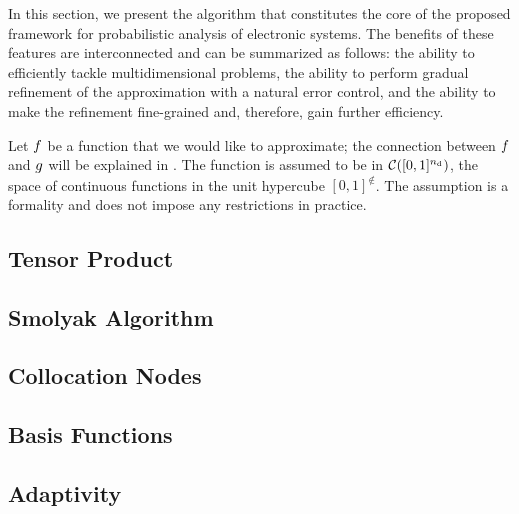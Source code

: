 In this section, we present the algorithm that constitutes the core of the
proposed framework for probabilistic analysis of electronic systems.  The benefits of these features are interconnected and can be
summarized as follows: the ability to efficiently tackle multidimensional
problems, the ability to perform gradual refinement of the approximation with a
natural error control, and the ability to make the refinement fine-grained and,
therefore, gain further efficiency. 

Let $f$ be a function that we would like to approximate; the connection between
$f$ and $g$ will be explained in . The function is assumed to
be in $\mathcal{C}([0, 1]^{n_\text{d}})$, the space of continuous functions in the unit
hypercube $[0, 1]^\nin$. The assumption is a formality and does not impose any
restrictions in practice.

\subsection{Tensor Product} 


\subsection{Smolyak Algorithm} 



\subsection{Collocation Nodes} 


\subsection{Basis Functions} 



\subsection{Adaptivity} 


